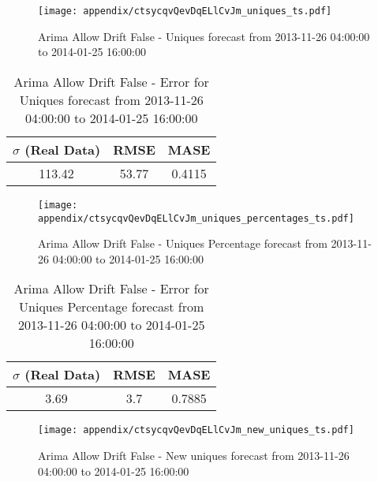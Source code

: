\begin{figure}[H] \begin{center} \leavevmode
\texttt{[image: appendix/ctsycqvQevDqELlCvJm\_uniques\_ts.pdf]} \caption{
Arima Allow Drift False - Uniques forecast from 2013-11-26 04:00:00 to 2014-01-25 16:00:00} \label{fig:appendix/ctsycqvQevDqELlCvJm_uniques_ts.pdf} \end{center}
\end{figure}

\begin{table}[H]
\centering
\footnotesize
\begin{tabular}{ccc}
$\sigma$ (Real Data) & RMSE & MASE   \\ \hline
113.42 & 53.77 & 0.4115 \\
\end{tabular}

\vspace{0.5cm}

\caption{
Arima Allow Drift False - Error for Uniques forecast from 2013-11-26 04:00:00 to 2014-01-25 16:00:00}
\end{table}

\begin{figure}[H] \begin{center} \leavevmode
\texttt{[image: appendix/ctsycqvQevDqELlCvJm\_uniques\_percentages\_ts.pdf]} \caption{
Arima Allow Drift False - Uniques Percentage forecast from 2013-11-26 04:00:00 to 2014-01-25 16:00:00} \label{fig:appendix/ctsycqvQevDqELlCvJm_uniques_percentages_ts.pdf} \end{center}
\end{figure}

\begin{table}[H]
\centering
\footnotesize
\begin{tabular}{ccc}
$\sigma$ (Real Data) & RMSE & MASE   \\ \hline
3.69 & 3.7 & 0.7885 \\
\end{tabular}

\vspace{0.5cm}

\caption{
Arima Allow Drift False - Error for Uniques Percentage forecast from 2013-11-26 04:00:00 to 2014-01-25 16:00:00}
\end{table}

\begin{figure}[H] \begin{center} \leavevmode
\texttt{[image: appendix/ctsycqvQevDqELlCvJm\_new\_uniques\_ts.pdf]} \caption{
Arima Allow Drift False - New uniques forecast from 2013-11-26 04:00:00 to 2014-01-25 16:00:00} \label{fig:appendix/ctsycqvQevDqELlCvJm_new_uniques_ts.pdf} \end{center}
\end{figure}

